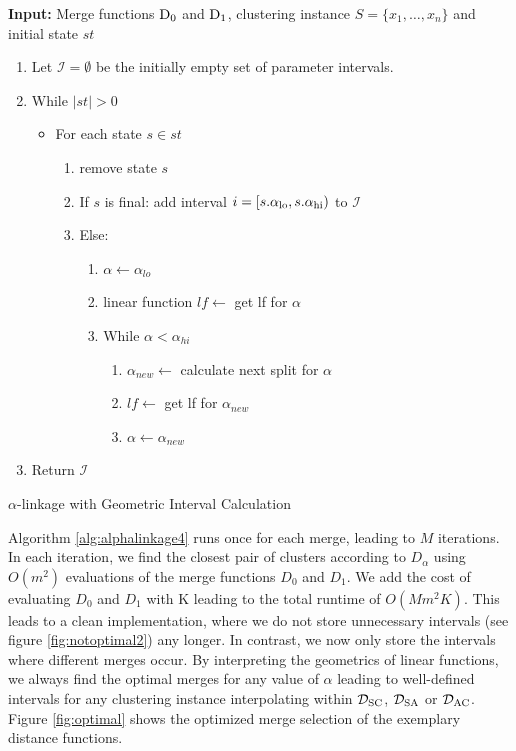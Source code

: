 \begin{algorithm}
    \textbf{Input:} Merge functions $\operatorname{D_{0}}$ and $\operatorname{D_{1}}$, clustering instance $S = \{x_1, \dots, x_n\}$ and initial state $st$
    \begin{enumerate}[nosep, leftmargin=*]
    \item Let $\mathcal{I} = \emptyset$ be the initially empty set of parameter intervals.
    \item While $|st| > 0$
    \begin{itemize}[nosep, leftmargin=*]
        \item For each state $s \in st$
        \begin{enumerate}
            \item remove state $s$\;
            \item If $s$ is final: add interval $i = [s.\alpha_\text{lo}, s.\alpha_\text{hi})$ to $\mathcal{I}$
            \item Else: 
            \begin{enumerate}
                \item $\alpha \gets \alpha_{lo}$\;
                \item linear function $lf \gets$ get lf for $\alpha$
                \item While $\alpha < \alpha_{hi}$
                \begin{enumerate}
                    \item $\alpha_{new} \gets$ calculate next split for $\alpha$
                    \item $lf \gets$ get lf for $\alpha_{new}$\;
                    \item $\alpha \gets \alpha_{new}$
                \end{enumerate}
            \end{enumerate}
        \end{enumerate}
    \end{itemize}
    \item Return $\mathcal{I}$
    \end{enumerate}
    \caption{$\alpha$-linkage with Geometric Interval Calculation}
    \label{alg:alphalinkage4}
\end{algorithm}

Algorithm \ref{alg:alphalinkage4} runs once for each merge, leading to $M$ iterations. In each iteration, we find the closest pair of clusters according to $D_\alpha$ using $O(m^2)$ evaluations of the merge functions $D_0$ and $D_1$. We add the cost of evaluating $D_0$ and $D_1$ with K leading to the total runtime of $O(Mm^2K)$. This leads to a clean implementation, where we do not store unnecessary intervals (see figure \ref{fig:notoptimal2}) any longer. In contrast, we now only store the intervals where different merges occur. By interpreting the geometrics of linear functions, we always find the optimal merges for any value of $\alpha$ leading to well-defined intervals for any clustering instance interpolating within $\mathcal{D}_\text{SC}$, $\mathcal{D}_\text{SA}$ or $\mathcal{D}_\text{AC}$. Figure \ref{fig:optimal} shows the optimized merge selection of the exemplary distance functions.

